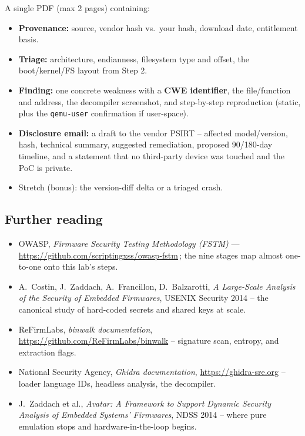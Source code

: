 \documentclass[11pt,a4paper]{article}
\begin{document}
\begin{deliverbox}
A single PDF (max 2 pages) containing:
\begin{itemize}\setlength{\itemsep}{1pt}
  \item \textbf{Provenance:} source, vendor hash vs.\ your hash,
        download date, entitlement basis.
  \item \textbf{Triage:} architecture, endianness, filesystem type and
        offset, the boot/kernel/FS layout from Step 2.
  \item \textbf{Finding:} one concrete weakness with a \textbf{CWE
        identifier}, the file/function and address, the decompiler
        screenshot, and step-by-step reproduction (static, plus the
        \texttt{qemu-user} confirmation if user-space).
  \item \textbf{Disclosure email:} a draft to the vendor PSIRT --
        affected model/version, hash, technical summary, suggested
        remediation, proposed 90/180-day timeline, and a statement
        that no third-party device was touched and the PoC is private.
  \item Stretch (bonus): the version-diff delta or a triaged crash.
\end{itemize}
\end{deliverbox}

\subsection*{Further reading}
\begin{itemize}\setlength{\itemsep}{1pt}
  \item OWASP, \emph{Firmware Security Testing Methodology (FSTM)} ---
        \url{https://github.com/scriptingxss/owasp-fstm}\,;
        the nine stages map almost one-to-one onto this lab's steps.
  \item A.\ Costin, J.\ Zaddach, A.\ Francillon, D.\ Balzarotti,
        \emph{A Large-Scale Analysis of the Security of Embedded
        Firmwares}, USENIX Security 2014 -- the canonical study of
        hard-coded secrets and shared keys at scale.
  \item ReFirmLabs, \emph{binwalk documentation},
        \url{https://github.com/ReFirmLabs/binwalk} -- signature scan,
        entropy, and extraction flags.
  \item National Security Agency, \emph{Ghidra documentation},
        \url{https://ghidra-sre.org} -- loader language IDs, headless
        analysis, the decompiler.
  \item J.\ Zaddach et al., \emph{Avatar: A Framework to Support
        Dynamic Security Analysis of Embedded Systems' Firmwares},
        NDSS 2014 -- where pure emulation stops and
        hardware-in-the-loop begins.
\end{itemize}
\end{document}

